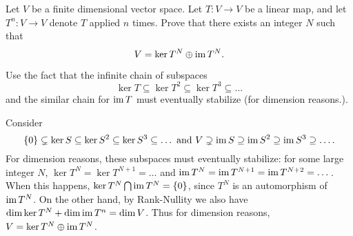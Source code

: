 \begin{sproblem}
	\label{prob:endomorphism_eventual_lemma}
	Let $V$ be a finite dimensional vector space.
	Let $T : V \to V$ be a linear map, and let $T^n : V \to V$ denote $T$ applied $n$ times.
	Prove that there exists an integer $N$ such that
	\[ V = \ker T^N \oplus \operatorname{im} T^N. \]
	\begin{hint}
		Use the fact that the infinite chain of subspaces
		\[ \ker T \subseteq \ker T^2 \subseteq \ker T^3 \subseteq \dots \]
		and the similar chain for $\operatorname{im} T$ must eventually stabilize
		(for dimension reasons.).
	\end{hint}
	\begin{sol}
		Consider
		\[
			\{0\} \subsetneq \ker S \subseteq \ker S^2 \subseteq \ker S^3 \subseteq \dots
			\text{  and  }
			V \supsetneq \operatorname{im} S \supseteq \operatorname{im} S^2 \supseteq \operatorname{im} S^3 \supseteq \dots.
		\]
		For dimension reasons, these subspaces must eventually stabilize:
		for some large integer $N$,
		$\ker T^N = \ker T^{N+1} = \dots$
		and $\operatorname{im} T^N = \operatorname{im} T^{N+1} = \operatorname{im} T^{N+2} = \dots$.
		When this happens, $\ker T^N \bigcap \operatorname{im} T^N = \{0\}$,
		since $T^N$ is an automorphism of $\operatorname{im} T^N$.
		On the other hand, by Rank-Nullity we also have
		$\dim \ker T^N + \dim \operatorname{im} T^n = \dim V$.
		Thus for dimension reasons, $V = \ker T^N \oplus \operatorname{im} T^N$.
	\end{sol}
\end{sproblem}


